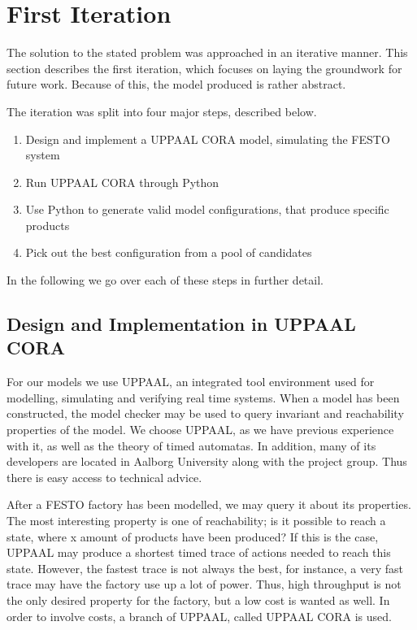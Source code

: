 \chapter{First Iteration}
\label{ch:firstiteration}
The solution to the stated problem was approached in an iterative manner. This section describes the first iteration, which focuses on laying the groundwork for future work. Because of this, the model produced is rather abstract.

The iteration was split into four major steps, described below.

\begin{enumerate}
\item Design and implement a UPPAAL CORA model, simulating the FESTO system
\item Run UPPAAL CORA through Python 
\item Use Python to generate valid model configurations, that produce specific products
\item Pick out the best configuration from a pool of candidates
\end{enumerate}

In the following we go over each of these steps in further detail.

\section{Design and Implementation in UPPAAL CORA}\label{sec:DesignAndImplementationInUPPAALCORA}
For our models we use UPPAAL, an integrated tool environment used for modelling, simulating and verifying real time systems. When a model has been constructed, the model checker may be used to query invariant and reachability properties of the model. We choose UPPAAL, as we have previous experience with it, as well as the theory of timed automatas. In addition, many of its developers are located in Aalborg University along with the project group. Thus there is easy access to technical advice.

After a FESTO factory has been modelled, we may query it about its properties. The most interesting property is one of reachability; is it possible to reach a state, where x amount of products have been produced? If this is the case, UPPAAL may produce a shortest timed trace of actions needed to reach this state. However, the fastest trace is not always the best, for instance, a very fast trace may have the factory use up a lot of power. Thus, high throughput is not the only desired property for the factory, but a low cost is wanted as well. In order to involve costs, a branch of UPPAAL, called UPPAAL CORA\cite{UPPAALCORA} is used.

